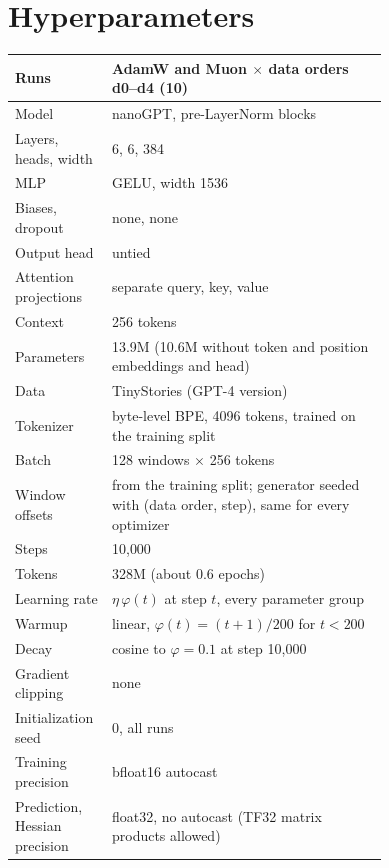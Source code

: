 \section{Hyperparameters}
\label{app:hparams}

\begin{center}\small
\captionsetup{type=table}
\caption{Hyperparameters shared by the AdamW and Muon runs.}
\label{tab:app-shared}
\begin{tabular}{@{}lp{0.74\linewidth}@{}}
\hline
Runs & AdamW and Muon $\times$ data orders d0--d4 (10) \\
\hline
Model & nanoGPT, pre-LayerNorm blocks \\
Layers, heads, width & 6, 6, 384 \\
MLP & GELU, width 1536 \\
Biases, dropout & none, none \\
Output head & untied \\
Attention projections & separate query, key, value \\
Context & 256 tokens \\
Parameters & 13.9M (10.6M without token and position embeddings and head) \\
\hline
Data & TinyStories (GPT-4 version) \\
Tokenizer & byte-level BPE, 4096 tokens, trained on the training split \\
Batch & 128 windows $\times$ 256 tokens \\
Window offsets & from the training split; generator seeded with (data order, step), same for every optimizer \\
\hline
Steps & 10{,}000 \\
Tokens & 328M (about 0.6 epochs) \\
Learning rate & $\eta\,\varphi(t)$ at step $t$, every parameter group \\
Warmup & linear, $\varphi(t)=(t+1)/200$ for $t<200$ \\
Decay & cosine to $\varphi=0.1$ at step 10{,}000 \\
Gradient clipping & none \\
\hline
Initialization seed & 0, all runs \\
Training precision & bfloat16 autocast \\
Prediction, Hessian precision & float32, no autocast (TF32 matrix products allowed) \\

\end{tabular}
\end{center}
